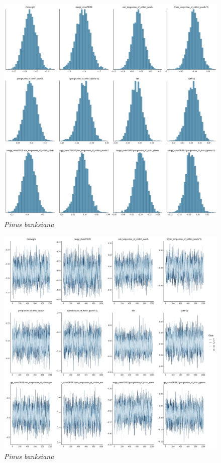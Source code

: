 \documentclass[letterpaper, 12pt]{article}
\begin{document}
\begin{figure}
	\centering
	\includegraphics[scale=0.4]{./183319-PIN-BAN_hist}
	\caption{\textit{Pinus banksiana}}
\end{figure}

\begin{figure}
	\centering
	\includegraphics[scale=0.4]{./183319-PIN-BAN_traces}
	\caption{\textit{Pinus banksiana}}
\end{figure}
\end{document}
